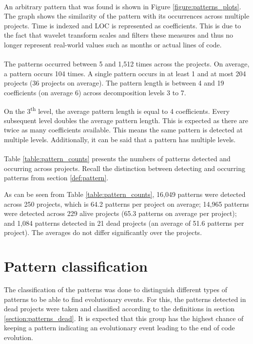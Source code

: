 \paragraph{}
An arbitrary pattern that was found is shown in Figure
\ref{figure:patterns_plots}. The graph shows the similarity of the pattern with
its occurrences across multiple projects. Time is indexed and LOC is
represented as coefficients. This is due to the fact that wavelet transform
scales and filters these measures and thus no longer represent real-world
values such as months or actual lines of code.



\paragraph{}
The patterns occurred between 5 and 1,512 times across the projects. On
average, a pattern occurs 104 times. A single pattern occurs in at least 1 and
at most 204 projects (36 projects on average). The pattern length is between 4
and 19 coefficients (on average 6) across decomposition levels 3 to 7.

On the 3\textsuperscript{th} level, the average pattern length is equal to 4
coefficients. Every subsequent level doubles the average pattern length. This
is expected as there are twice as many coefficients available. This means the
same pattern is detected at multiple levels. Additionally, it can be said that
a pattern has multiple levels.

\paragraph{}
Table \ref{table:pattern_counts} presents the numbers of patterns
detected and occurring across projects. Recall the distinction between
detecting and occurring patterns from section \ref{def:pattern}.



\noindent
As can be seen from Table \ref{table:pattern_counts}, 16,049 patterns were
detected across 250 projects, which is 64.2 patterns per project on average;
14,965 patterns were detected across 229 alive projects (65.3 patterns on
average per project); and 1,084 patterns detected in 21 dead projects (an
average of 51.6 patterns per project). The averages do not differ significantly
over the projects.



\section{Pattern classification}
The classification of the patterns was done to distinguish different types of
patterns to be able to find evolutionary events. For this, the patterns
detected in dead projects were taken and classified according to
the definitions in section \ref{section:patterns_dead}. It is expected that
this group has the highest chance of keeping a pattern indicating an
evolutionary event leading to the end of code evolution.


